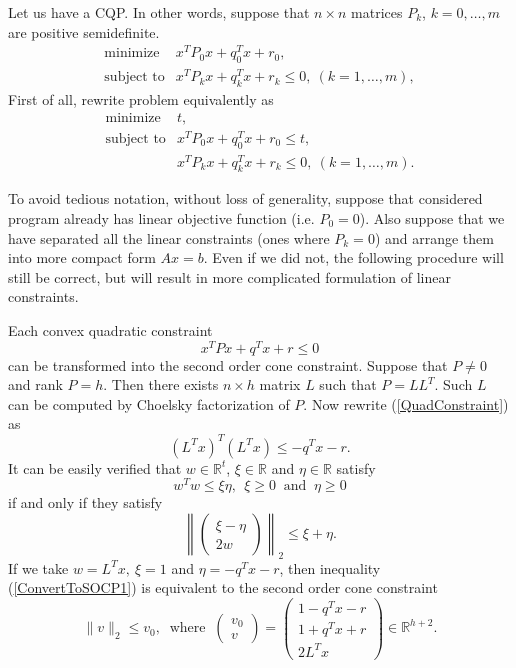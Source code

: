 \documentclass[12pt]{book}
\theoremstyle{definition}
\begin{document}
Let us have a CQP. In other words, suppose that $n\times n$ matrices $P_k$, $k=0,\dots ,m$ are positive semidefinite. 
\begin{equation*}
\begin{array}{ll}
\mbox{minimize}& x^TP_0x + q_0^Tx + r_0, \\
\mbox{subject to}& x^TP_kx + q_k^Tx + r_k \leq 0, \  (k = 1,\dots ,m),
\end{array} 
\end{equation*}
First of all, rewrite problem equivalently as
\begin{equation*}
\begin{array}{ll}
\mbox{minimize}& t, \\
\mbox{subject to} & x^TP_0x + q_0^Tx + r_0 \leq t,\\
& x^TP_kx + q_k^Tx + r_k \leq 0, \  (k = 1,\dots ,m).
\end{array} 
\end{equation*}

To avoid tedious notation, without loss of generality, suppose that considered program already has linear objective function (i.e. $P_0 = 0$).  Also suppose that we have separated all the linear constraints (ones where $P_k = 0$) and arrange them into more compact form $Ax=b$. Even if we did not, the following procedure will still be correct, but will result in more complicated formulation of linear constraints.

Each convex quadratic constraint 
\begin{equation}
\label{QuadConstraint}
x^TPx + q^Tx + r \leq 0
\end{equation} 
can be transformed into the second order cone constraint.  Suppose that $P\neq 0$ and rank $P = h.$ Then there exists $n\times h$ matrix $L$ such that $P=LL^T$. Such $L$ can be computed by Choelsky factorization of $P$. Now rewrite (\ref{QuadConstraint}) as 
\begin{equation}
\label{ConvertToSOCP1}
(L^Tx)^T(L^Tx)\leq -q^Tx - r.
\end{equation}
It can be easily verified that $w\in \mathbb{R}^t$, $\xi \in \mathbb{R}$ and $\eta \in \mathbb{R}$ satisfy
$$w^Tw\leq \xi\eta, \ \ \xi\geq 0\ \mbox{ and } \ \eta\geq 0$$
if and only if they satisfy
$$\left\|\left( \begin{array}{c}
\xi-\eta\\
2w
\end{array}\right)\right\|_2
\leq \xi+\eta . $$
If we take $w=L^Tx, \ \xi = 1$ and $\eta = -q^Tx - r$, then inequality (\ref{ConvertToSOCP1}) is equivalent to the second order cone constraint
\begin{equation}
\label{ConvertedQCintoSOCC}
 \|v\|_2\leq v_0, \ \mbox{  where  } \ \left(\begin{array}{c}
v_0\\
v
\end{array}\right) = 
\left(\begin{array}{c}
1- q^Tx - r\\
1 + q^Tx + r\\
2L^Tx
\end{array}\right)\in \mathbb{R}^{h+2}.
\end{equation}
\end{document}
